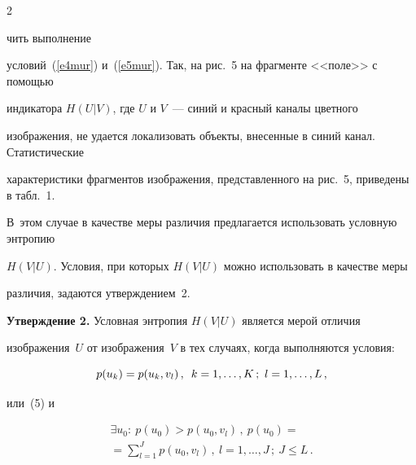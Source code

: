 \begin{multicols}{2}





\noindent


чить выполнение 


условий~(\ref{e4mur}) и~(\ref{e5mur}). Так, на рис.~5 на фрагменте <<поле>> с помощью 


индикатора $H(U\vert V)$, где $U$ и $V$~--- синий и красный каналы цветного 


изображения, не удается локализовать объекты, внесенные в синий канал. Статистические 


характеристики фрагментов изображения, представленного на рис.~5, приведены в табл.~1. 


В~этом случае в качестве меры различия предлагается использовать условную энтропию 


$H(V\vert U)$. Условия, при которых $H(V\vert U)$ можно использовать в качестве меры 


различия, задаются утверждением~2. 














\medskip





\noindent


\textbf{Утверждение 2.} Условная энтропия $H(V\vert U)$ является мерой отличия 


изображения~$U$ от изображения~$V$ в тех случаях, когда выполняются условия:


\begin{equation}


p(u_k) =p(u_k,v_l)\,,\enskip k=1, \ldots , K\,;\ l=1, \ldots ,L\,,


\label{e6mur}


\end{equation}


или~(5) и


\begin{multline}


\exists u_0:\ p(u_0)>p(u_0,v_l)\,,\ p(u_0)={}\\


{}=\sum\limits_{l=1}^J p(u_0,v_l)\,,\ l=1, \ldots , 


J\,;\ J\leq L\,.



\end{multline}
\end{multicols}
